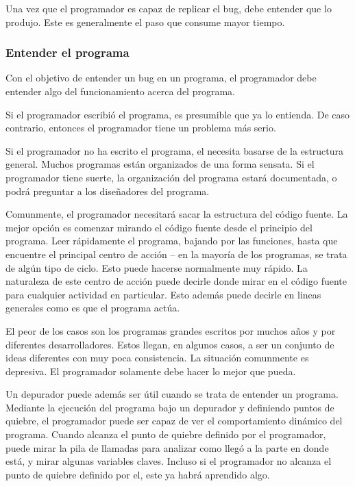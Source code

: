 \documentclass[12pt,a4paper]{report}
\begin{document}
Una vez que el programador es capaz de replicar el bug, debe entender que lo produjo.  Este es generalmente el paso que consume mayor tiempo.


\subsubsection{Entender el programa}

Con el objetivo de entender un bug en un programa, el programador debe entender algo del funcionamiento acerca del programa.

Si el programador escribió el programa, es presumible que ya lo entienda.  De caso contrario, entonces el programador tiene un problema más serio.

Si el programador no ha escrito el programa, el necesita basarse de la estructura general.  Muchos programas están organizados de una forma sensata.  Si el programador tiene suerte, la organización del programa estará documentada, o podrá preguntar a los diseñadores del programa.

Comunmente, el programador necesitará sacar la estructura del código fuente.  La mejor opción es comenzar mirando el código fuente desde el principio del programa.  Leer rápidamente el programa, bajando por las funciones, hasta que encuentre el principal centro de acción -- en la mayoría de los programas, se trata de algún tipo de ciclo.  Esto puede hacerse normalmente  muy rápido.  La naturaleza de este centro de acción puede decirle donde mirar en el código fuente para cualquier actividad en particular.  Esto además puede decirle en lineas generales como es que el programa actúa.

El peor de los casos son los programas grandes escritos por muchos años y por diferentes desarrolladores.  Estos llegan, en algunos casos, a ser un conjunto de ideas diferentes con muy poca consistencia.  La situación comunmente es depresiva.  El programador solamente debe hacer lo mejor que pueda.

Un depurador puede además ser útil cuando se trata de entender un programa.  Mediante la ejecución del programa bajo un depurador y definiendo puntos de quiebre, el programador puede ser capaz de ver el comportamiento dinámico del programa.  Cuando alcanza el punto de quiebre definido por el programador, puede mirar la pila de llamadas para analizar como llegó a la parte en donde está, y mirar algunas variables claves.  Incluso si el programador no alcanza el punto de quiebre definido por el, este ya habrá aprendido algo.
\end{document}
